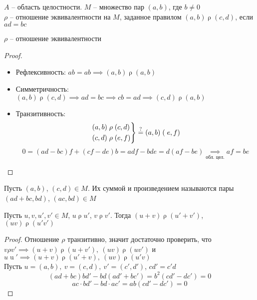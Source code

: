 \begin{notation}
	$A$ -- область целостности. $M$ -- множество пар $(a,b)$, где $b \ne 0$ \\
    $\rho$ -- отношение эквивалентности на $M$, заданное правилом $(a,b) \mathrel{\rho} (c,d)$, если $ ad = bc $
\end{notation}

\begin{lemma}
	$ \rho $ -- отношение эквивалентности
\end{lemma}

\begin{proof}
    \hfill
    \begin{itemize}
        \item Рефлексивность: $ ab = ab \implies (a,b) \mathrel\rho (a, b) $
        \item Симметричность: $ (a,b) \mathrel\rho (c,d) \implies ad = bc \implies cb = ad \implies (c,d) \mathrel\rho (a,b) $
        \item Транзитивность:
        $$ \begin{rcases} (a,b) \mathrel\rho (c,d) \\ (c,d) \mathrel\rho (e,f) \end{rcases} \stackrel?= (a,b) \mathrel (e,f) $$
        $$ 0 = (ad - bc)f + (cf -de)b = adf - bde = d(af - be) \underset{\text{обл. цел.}}{\implies} af = be $$
    \end{itemize}
\end{proof}

\begin{definition}
	Пусть $(a,b)$, $(c,d) \in M $. Их суммой и произведением называются пары $(ad + bc, bd)$, $(ac, bd) \in M$
\end{definition}

\begin{lemma}
	Пусть $u, v, u', v' \in M $, $u \mathrel\rho u'$, $v \mathrel\rho v'$. Тогда $(u + v) \mathrel\rho (u' + v')$, $ (uv) \mathrel\rho (u'v')$
\end{lemma}

\begin{proof}
	Отношение $\rho$ транзитивно, значит достаточно проверить, что $v \rho v' \implies (u + v) \mathrel\rho (u + v'), ~ (uv) \mathrel\rho (uv') $ и $u \mathrel u' \implies (u + v) \mathrel\rho (u' + v), ~ (uv) \mathrel\rho (u'v) $ \\
    Пусть $u = (a,b), ~ v = (c,d), ~ v' = (c',d') $, $cd' = c'd$
    $$ (ad + bc)bd' - bd(ad' + bc') = b^2(cd' - dc') = 0 $$
    $$ ac \cdot bd' - bd \cdot ac' = ab(cd' - dc') = 0 $$
\end{proof}

